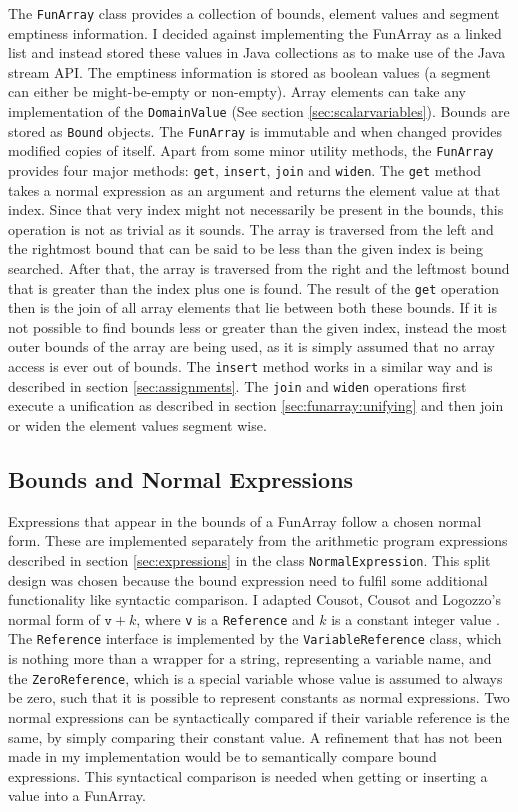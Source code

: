 The \texttt{FunArray} class provides a collection of bounds, element values and segment emptiness information. I decided against implementing the FunArray as a linked list and instead stored these values in Java collections as to make use of the Java stream API. The emptiness information is stored as boolean values (a segment can either be might-be-empty or non-empty). Array elements can take any implementation of the \texttt{DomainValue} (See section \ref{sec:scalarvariables}). Bounds are stored as \texttt{Bound} objects. The \texttt{FunArray} is immutable and when changed provides modified copies of itself.
Apart from some minor utility methods, the \texttt{FunArray} provides four major methods: \texttt{get}, \texttt{insert}, \texttt{join} and \texttt{widen}. The \texttt{get} method takes a normal expression as an argument and returns the element value at that index. Since that very index might not necessarily be present in the bounds, this operation is not as trivial as it sounds. The array is traversed from the left and the rightmost bound that can be said to be less than the given index is being searched. After that, the array is traversed from the right and the leftmost bound that is greater than the index plus one is found. The result of the \texttt{get} operation then is the join of all array elements that lie between both these bounds. If it is not possible to find bounds less or greater than the given index, instead the most outer bounds of the array are being used, as it is simply assumed that no array access is ever out of bounds. The \texttt{insert} method works in a similar way and is described in section \ref{sec:assignments}. 
The \texttt{join} and \texttt{widen} operations first execute a unification as described in section \ref{sec:funarray:unifying} and then join or widen the element values segment wise.

\subsection{Bounds and Normal Expressions}

Expressions that appear in the bounds of a FunArray follow a chosen normal form. These are implemented separately from the arithmetic program expressions described in section \ref{sec:expressions} in the class \texttt{NormalExpression}. This split design was chosen because the bound expression need to fulfil some additional functionality like syntactic comparison. I adapted Cousot, Cousot and Logozzo's normal form of $\mathtt{v}+k$, where \texttt{v} is a \texttt{Reference} and $k$ is a constant integer value \cite{cousot2011}. The \texttt{Reference} interface is implemented by the \texttt{VariableReference} class, which is nothing more than a wrapper for a string, representing a variable name, and the \texttt{ZeroReference}, which is a special variable whose value is assumed to always be zero, such that it is possible to represent constants as normal expressions. Two normal expressions can be syntactically compared if their variable reference is the same, by simply comparing their constant value. A refinement that has not been made in my implementation would be to semantically compare bound expressions. This syntactical comparison is needed when getting or inserting a value into a FunArray.

